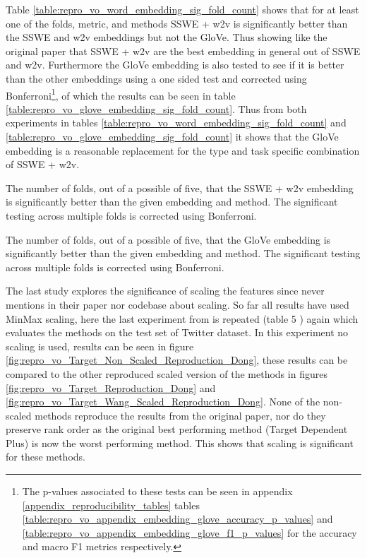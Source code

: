 Table \ref{table:repro_vo_word_embedding_sig_fold_count} shows that for at least one of the folds, metric, and methods SSWE + w2v is significantly better than the SSWE and w2v embeddings but not the GloVe. Thus showing like the original paper that SSWE + w2v are the best embedding in general out of SSWE and w2v. Furthermore the GloVe embedding is also tested to see if it is better than the other embeddings using a one sided test and corrected using Bonferroni\footnote{The p-values associated to these tests can be seen in appendix \ref{appendix_reproducibility_tables} tables \ref{table:repro_vo_appendix_embedding_glove_accuracy_p_values} and \ref{table:repro_vo_appendix_embedding_glove_f1_p_values} for the accuracy and macro F1 metrics respectively.}, of which the results can be seen in table \ref{table:repro_vo_glove_embedding_sig_fold_count}. Thus from both experiments in tables \ref{table:repro_vo_word_embedding_sig_fold_count} and \ref{table:repro_vo_glove_embedding_sig_fold_count} it shows that the GloVe embedding is a reasonable replacement for the type and task specific combination of SSWE + w2v.

\begin{table}[!h]
    \centering
    
    \caption{The number of folds, out of a possible of five, that the SSWE + w2v embedding is significantly better than the given embedding and method. The significant testing across multiple folds is corrected using Bonferroni.}
    \label{table:repro_vo_word_embedding_sig_fold_count}
\end{table}

\begin{table}[!h]
    \centering
    
    \caption{The number of folds, out of a possible of five, that the GloVe embedding is significantly better than the given embedding and method. The significant testing across multiple folds is corrected using Bonferroni.}
    \label{table:repro_vo_glove_embedding_sig_fold_count}
\end{table}

The last study explores the significance of scaling the features since \citet{vo2015target} never mentions in their paper nor codebase about scaling. So far all results have used MinMax scaling, here the last experiment from \citet{vo2015target} is repeated (table 5 \citep{vo2015target}) again which evaluates the methods on the test set of \citet{dong-etal-2014-adaptive} Twitter dataset. In this experiment no scaling is used, results can be seen in figure \ref{fig:repro_vo_Target_Non_Scaled_Reproduction_Dong}, these results can be compared to the other reproduced scaled version of the methods in figures \ref{fig:repro_vo_Target_Reproduction_Dong} and \ref{fig:repro_vo_Target_Wang_Scaled_Reproduction_Dong}. None of the non-scaled methods reproduce the results from the original paper, nor do they preserve rank order as the original best performing method (Target Dependent Plus) is now the worst performing method. This shows that scaling is significant for these methods.

